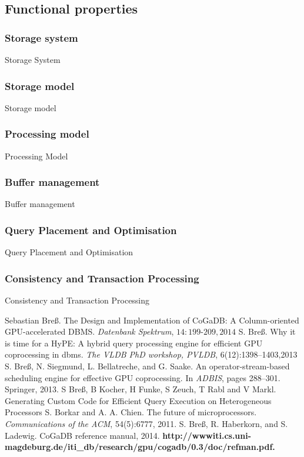 \documentclass[a4paper, 11pt]{article}
\begin{document}
\subsection*{Functional properties}
\subsubsection*{Storage system}
Storage System

\subsubsection*{Storage model}
Storage model

\subsubsection*{Processing model}
Processing Model

\subsubsection*{Buffer management}
Buffer management

\subsubsection*{Query Placement and Optimisation}
Query Placement and Optimisation

\subsubsection*{Consistency and Transaction Processing}
Consistency and Transaction Processing


\begin{thebibliography}{9}
Sebastian Bre{ß}. The Design and Implementation of CoGaDB: A Column-oriented GPU-accelerated DBMS. \emph{Datenbank Spektrum}, $14:199\text{-}209,2014$ 
  S. Breß. Why it is time for a HyPE: A hybrid query processing engine for efficient
GPU coprocessing in dbms. \emph{The VLDB PhD workshop, PVLDB}, 6(12):1398–1403,2013
 S. Breß, N. Siegmund, L. Bellatreche, and G. Saake. An operator-stream-based
scheduling engine for effective GPU coprocessing. In \emph{ADBIS}, pages 288–301. Springer, 2013.
 S Breß, B Kocher, H Funke, S Zeuch, T Rabl and V Markl. Generating Custom Code for Efficient Query Execution on Heterogeneous Processors
S. Borkar and A. A. Chien. The future of microprocessors. \emph{Communications of the
ACM}, 54(5):6777, 2011.
S. Breß, R. Haberkorn, and S. Ladewig. CoGaDB reference manual, 2014. \textbf{http://wwwiti.cs.uni-magdeburg.de/iti\_db/research/gpu/cogadb/0.3/doc/refman.pdf.}
\end{thebibliography}
\end{document}
